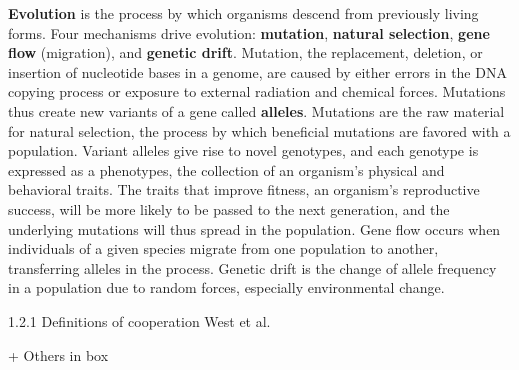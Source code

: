 \documentclass{tufte-book} %
\begin{document}
\textbf{Evolution} is the process by which organisms descend from previously living forms. Four mechanisms drive evolution: \textbf{mutation}, \textbf{natural selection}, \textbf{gene flow} (migration), and \textbf{genetic drift}. Mutation, the replacement, deletion, or insertion of nucleotide bases in a genome, are caused by either errors in the DNA copying process or exposure to external radiation and chemical forces. Mutations thus create new variants of a gene called \textbf{alleles}. Mutations are the raw material for natural selection, the process by which beneficial mutations are favored with a population. Variant alleles give rise to novel genotypes, and each genotype is expressed as a phenotypes, the collection of an organism’s physical and behavioral traits. The traits that improve fitness, an organism’s reproductive success, will be more likely to be passed to the next generation, and the underlying mutations will thus spread in the population. Gene flow occurs when individuals of a given species migrate from one population to another, transferring alleles in the process. Genetic drift is the change of allele frequency in a population due to random forces, especially environmental change.

1.2.1 Definitions of cooperation
West et al. 

+ Others in box
\end{document}
